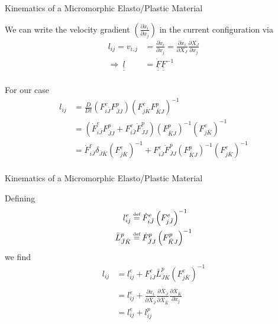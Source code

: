 \documentclass[11pt]{beamer}
\newcommand{\TEN}[1]{\underline{\underline{#1}}}
\newcommand\defeq{\mathrel{\stackrel{\makebox[0pt]{\mbox{\normalfont\tiny def}}}{=}}}
\begin{document}
\begin{frame}{Kinematics of a Micromorphic Elasto/Plastic Material}

We can write the velocity gradient $\left(\frac{\partial \dot{x}_i}{\partial x_j}\right)$ in the current configuration via
\begin{align*}
l_{ij} = v_{i,j} &= \frac{\partial \dot{x}_i}{\partial x_j} =  \frac{\partial \dot{x}_i}{\partial X_J} \frac{\partial X_J}{\partial x_j}\\
\Rightarrow\ \TEN{l} &= \dot{\TEN{F}} \TEN{F}^{-1}\\
\end{align*}

For our case
\begin{align*}
l_{ij} &= \frac{D}{Dt}\left(F_{i\bar{J}}^e F_{\bar{J}J}^p\right)\left(F_{j\bar{K}}^e F_{\bar{K} J}^p\right)^{-1}\\
&= \left(\dot{F}_{i\bar{J}}^e F_{\bar{J}J}^p + F_{i\bar{J}}^e \dot{F}_{\bar{J}J}^p\right)\left(F_{ \bar{K}J}^p\right)^{-1}\left(F_{j\bar{K}}^e\right)^{-1}\\
&= \dot{F}_{i\bar{J}}^e \delta_{\bar{J}\bar{K}} \left(F_{j\bar{K}}^e\right)^{-1} + F_{i\bar{J}}^e \dot{F}_{\bar{J}J}^p\left(F_{\bar{K}J}^p\right)^{-1}\left(F_{j\bar{K}}^e\right)^{-1}\\
\end{align*}

\end{frame}

\begin{frame}{Kinematics of a Micromorphic Elasto/Plastic Material}

Defining
\begin{align*}
l_{ij}^e &\defeq \dot{F}_{i\bar{J}}^e \left(F_{j\bar{J}}^e\right)^{-1}\\
\bar{L}_{\bar{J}\bar{K}}^p &\defeq \dot{F}_{\bar{J}J}^p\left(F_{\bar{K}J}^p\right)^{-1}\\
\end{align*}
we find
\begin{align*}
l_{ij} &= l_{ij}^e + F_{i\bar{J}}^e \bar{L}_{\bar{J}\bar{K}}^p \left(F_{j\bar{K}}^e\right)^{-1}\\
&= l_{ij}^e + \frac{\partial x_i}{\partial \bar{X}_{\bar{J}}} \frac{\partial \dot{\bar{X}}_{\bar{J}}}{\partial \bar{X}_{\bar{K}}} \frac{\partial \bar{X}_{\bar{K}}}{\partial x_j}\\
&= l_{ij}^e + l_{ij}^p
\end{align*}

\end{frame}
\end{document}
